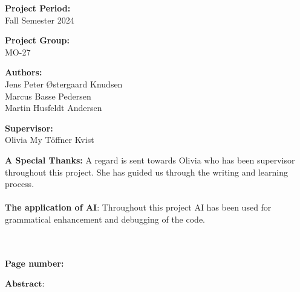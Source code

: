 \begin{titlepage}
\begin{minipage}[t]{0.48\textwidth}
\textbf{Project Period:} \\[5pt]\hspace*{2ex}
\hspace*{-13pt}Fall Semester 2024 \\\hspace*{2ex}

\textbf{Project Group:} \\[5pt]\bigskip\hspace{2ex}
\hspace*{-13pt}MO-27	

\textbf{Authors:} \\[5pt]\hspace*{2ex}\hspace*{-13pt}
Jens Peter Østergaard Knudsen \\ \hspace*{2ex}
\hspace*{-13pt}Marcus Basse Pedersen \\\hspace*{2ex}
\hspace*{-13pt}Martin Husfeldt Andersen \\\hspace*{2ex}
\space 

\textbf{Supervisor:} \\[5pt]\hspace*{2ex}\hspace*{-13pt}
Olivia My Töffner Kvist
 \hspace*{-13pt}
 \\\hspace*{2ex}
 
 \textbf{A Special Thanks:} A regard is sent towards Olivia who has been supervisor throughout this project. She has guided us through the writing and learning process.
 \\[5pt]\hspace*{2ex}\hspace*{-13pt}\\
 
\textbf{The application of AI}: Throughout this project AI has been used for grammatical enhancement and debugging of the code.

 \hspace*{-13pt}
 \\\hspace*{2ex}\\
\textbf{Page number: \pageref{LastPage}
} \\ 


\end{minipage}
\hfill
\begin{minipage}[t]{0.483\textwidth}

$\textbf{Abstract:}$ \\[5pt]
\fbox{\parbox{7cm}{}}
\end{minipage}

\vfill

\end{titlepage}
